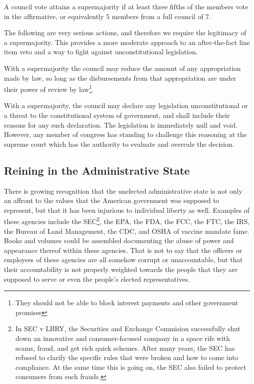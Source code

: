 \documentclass{article}
\begin{document}
\begin{quoting}
A council vote attains a supermajority if at least three fifths of the members vote in the affirmative, or equivalently 5 members from a full council of 7.
\end{quoting}

The following are very serious actions, and therefore we require the legitimacy of a supermajority. This provides a more moderate approach to an after-the-fact line item veto and a way to fight against unconstitutional legislation.

\begin{quoting}
With a supermajority the council may reduce the amount of any appropriation made by law, so long as the disbursements from that appropriation are under their power of review by law\footnote{They should not be able to block interest payments and other government promises}.

With a supermajority, the council may declare any legislation unconstitutional or a threat to the constitutional system of government, and shall include their reasons for any such declaration. The legislation is immediately null and void. However, any member of congress has standing to challenge this reasoning at the supreme court which has the authority to evaluate and overrule the decision.
\end{quoting}

\subsection{Reining in the Administrative State}

There is growing recognition that the unelected administrative state is not only an affront to the values that the American government was supposed to represent, but that it has been injurious to individual liberty as well. Examples of these agencies include the SEC\footnote{In SEC v LBRY, the Securities and Exchange Commision successfully shut down\cite{Barash} an innovative and consumer-focused company in a space rife with scams, fraud, and get rich quick schemes. After many years, the SEC has refused to clarify the specific rules that were broken and how to come into compliance. At the same time this is going on, the SEC also failed to protect consumers from such frauds.}, the EPA, the FDA, the FCC, the FTC, the IRS, the Bureau of Land Management, the CDC, and OSHA of vaccine mandate fame. Books and volumes could be assembled documenting the abuse of power and appearance thereof within these agencies. That is not to say that the officers or employees of these agencies are all somehow corrupt or unaccountable, but that their accountability is not properly weighted towards the people that they are supposed to serve or even the people's elected representatives.
\end{document}
